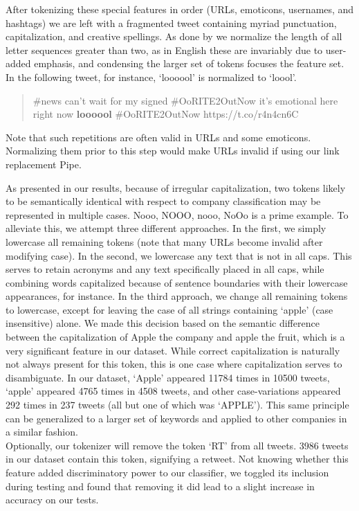 \documentclass[letterpaper]{article}
\begin{document}
After tokenizing these special features in order (URLs, emoticons, usernames, and hashtags) we are left with a fragmented tweet containing myriad punctuation, capitalization, and creative spellings. As done by \citet{potts2011} we normalize the length of all letter sequences greater than two, as in English these are invariably due to user-added emphasis, and condensing the larger set of tokens focuses the feature set. In the following tweet, for instance, `loooool' is normalized to `loool'.
\begin{quote}
\#news can't wait for my signed \#OoRITE2OutNow it's emotional here right now \textbf{loooool} \#OoRITE2OutNow https://t.co/r4n4cn6C 
\end{quote}

Note that such repetitions are often valid in URLs and some emoticons. Normalizing them prior to this step would make URLs invalid if using our link replacement Pipe.

As presented in our results, because of irregular capitalization, two tokens likely to be semantically identical with respect to company classification may be represented in multiple cases. {Nooo, NOOO, nooo, NoOo} is a prime example. To alleviate this, we attempt three different approaches. In the first, we simply lowercase all remaining tokens (note that many URLs become invalid after modifying case). In the second, we lowercase any text that is not in all caps. This serves to retain acronyms and any text specifically placed in all caps, while combining words capitalized because of sentence boundaries with their lowercase appearances, for instance. In the third approach, we change all remaining tokens to lowercase, except for leaving the case of all strings containing `apple' (case insensitive) alone. We made this decision based on the semantic difference between the capitalization of Apple the company and apple the fruit, which is a very significant feature in our dataset. While correct capitalization is naturally not always present for this token, this is one case where capitalization serves to disambiguate. In our dataset, `Apple' appeared 11784 times in 10500 tweets, `apple' appeared 4765 times in 4508 tweets, and other case-variations appeared 292 times in 237 tweets (all but one of which was `APPLE'). This same principle can be generalized to a larger set of keywords and applied to other companies in a similar fashion. \\

Optionally, our tokenizer will remove the token `RT' from all tweets. 3986 tweets in our dataset contain this token, signifying a retweet. Not knowing whether this feature added discriminatory power to our classifier, we toggled its inclusion during testing and found that removing it did lead to a slight increase in accuracy on our tests.\\
\end{document}
